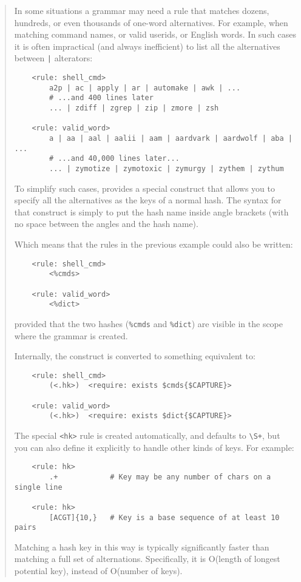 \begin{it}\begin{quotation}
In some situations a grammar may need a rule that matches dozens,
hundreds, or even thousands of one-word alternatives. For example, when
matching command names, or valid userids, or English words. In such
cases it is often impractical (and always inefficient) to list all the
alternatives between \verb#|# alterators:

\begin{verbatim}
    <rule: shell_cmd>
        a2p | ac | apply | ar | automake | awk | ...
        # ...and 400 lines later
        ... | zdiff | zgrep | zip | zmore | zsh

    <rule: valid_word>
        a | aa | aal | aalii | aam | aardvark | aardwolf | aba | ...
        # ...and 40,000 lines later... 
        ... | zymotize | zymotoxic | zymurgy | zythem | zythum
\end{verbatim}

To simplify such cases,  provides a special construct
that allows you to specify all the alternatives as the keys of a normal
hash. The syntax for that construct is simply to put the hash name inside
angle brackets (with no space between the angles and the hash name).

Which means that the rules in the previous example could also be written:

\begin{verbatim}
    <rule: shell_cmd>
        <%cmds>

    <rule: valid_word>
        <%dict>
\end{verbatim}

provided that the two hashes (\verb|%cmds| and \verb|%dict|) 
are visible in the scope where the grammar is created.

Internally, the construct is converted to something equivalent to:

\begin{verbatim}
    <rule: shell_cmd>
        (<.hk>)  <require: exists $cmds{$CAPTURE}>

    <rule: valid_word>
        (<.hk>)  <require: exists $dict{$CAPTURE}>
\end{verbatim}

The special \verb|<hk>| rule is created automatically, and defaults to \verb|\S+|,
but you can also define it explicitly to handle other kinds of keys. For
example:

\begin{verbatim}
    <rule: hk>
        .+            # Key may be any number of chars on a single line

    <rule: hk>
        [ACGT]{10,}   # Key is a base sequence of at least 10 pairs
\end{verbatim}

Matching a hash key in this way is typically significantly faster than
matching a full set of alternations. Specifically, it is O(length of
longest potential key), instead of O(number of keys).
\end{quotation}\end{it}


